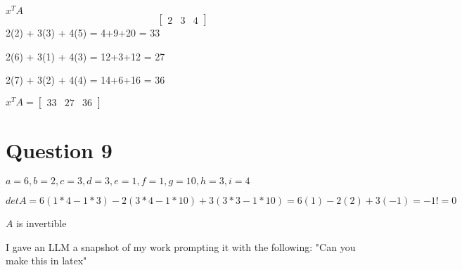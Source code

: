 \documentclass[12pt]{article}
\begin{document}
\vspace{0.5cm}
$x^TA $
$$
\begin{bmatrix}
    2 & 3 & 4
\end{bmatrix}
$$
2(2) + 3(3) + 4(5) = 4+9+20 = 33

2(6) + 3(1) + 4(3) = 12+3+12 = 27

2(7) + 3(2) + 4(4) = 14+6+16 = 36

$x^TA = \begin{bmatrix}
    33 &27 &36
\end{bmatrix}$

\vspace{10cm}

\newpage

\section*{Question 9} 

$a=6, b=2, c=3, d=3, e=1, f=1, g=10, h=3, i=4$

$det A = 6(1*4 -1*3) - 2(3*4-1*10) + 3(3*3-1*10) = 6(1) - 2(2) + 3(-1) = -1 != 0$

$A$ is invertible

I gave an LLM a snapshot of my work prompting it with the following: "Can you make this in latex"
\end{document}
